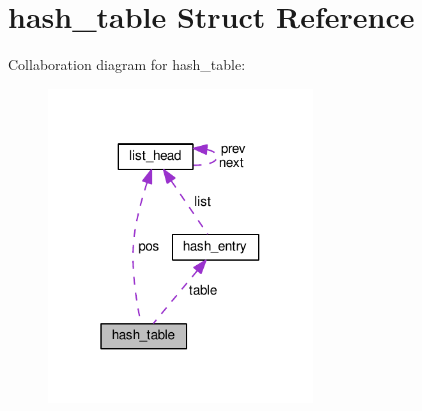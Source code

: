 \hypertarget{structhash__table}{}\section{hash\+\_\+table Struct Reference}
\label{structhash__table}


Collaboration diagram for hash\+\_\+table\+:\nopagebreak
\begin{figure}[H]
\begin{center}
\leavevmode
\includegraphics[width=199pt]{structhash__table__coll__graph}
\end{center}
\end{figure}
